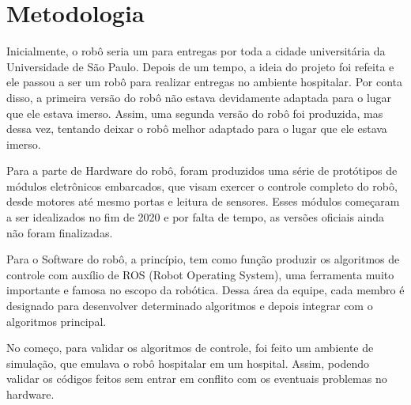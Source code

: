 \documentclass[../poliXuniversity_hospital_-USP-report.tex]{subfiles}
\begin{document}
\chapter{Metodologia}

Inicialmente, o robô seria um para entregas por toda a cidade universitária da Universidade de São Paulo. Depois de um tempo, a ideia do projeto foi refeita e ele passou a ser um robô para realizar entregas no ambiente hospitalar. Por conta disso, a primeira versão do robô não estava devidamente adaptada para o lugar que ele estava imerso. Assim, uma segunda versão do robô foi produzida, mas dessa vez, tentando deixar o robô melhor adaptado para o lugar que ele estava imerso. 

Para a parte de Hardware do robô, foram produzidos uma série de protótipos de módulos eletrônicos embarcados, que visam exercer o controle completo do robô, desde motores até mesmo portas e leitura de sensores. Esses módulos começaram a ser idealizados no fim de 2020 e por falta de tempo, as versões oficiais ainda não foram finalizadas.

Para o Software do robô, a princípio, tem como função produzir os algoritmos de controle com auxílio de ROS (Robot Operating System), uma ferramenta muito importante e famosa no escopo da robótica. Dessa área da equipe, cada membro é designado para desenvolver determinado algoritmos e depois integrar com o algoritmos principal.

No começo, para validar os algoritmos de controle, foi feito um ambiente de simulação, que emulava o robô hospitalar em um hospital. Assim, podendo validar os códigos feitos sem entrar em conflito com os eventuais problemas no hardware.
\end{document}
